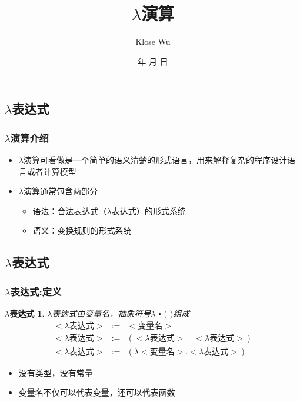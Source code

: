 \documentclass[CJK,compress,hyperref]{beamer}
\renewcommand{\today}{\number\year 年 \number\month 月 \number\day 日}
\begin{document}
\begin{CJK}{UTF8}{song}
 
\title{$\lambda$演算}
\author{Klose Wu}
\date{ \today}

\frame{\titlepage}
\tableofcontents
\section{$\lambda$表达式}

\begin{frame}
  \frametitle{$\lambda$演算介绍}
  \begin{itemize}
  \item $\lambda$演算可看做是一个简单的语义清楚的形式语言，用来解释复杂的程序设计语言或者计算模型
  \item $\lambda$演算通常包含两部分
    \begin{itemize} 
    \item{语法}：合法表达式（{\color{red}$\lambda$}表达式）的形式系统
    \item{语义}：变换规则的形式系统
    \end{itemize}
  \end{itemize}
\end{frame}

\subsection{ $\lambda$表达式}

\begin{frame}
  \frametitle{$\lambda$表达式:定义}
  \newtheorem{LE}{$\lambda$表达式} 
  \begin{LE}
    $\lambda$表达式由变量名，抽象符号$\lambda$  $\centerdot$  $($  $)$组成 
    \begin{eqnarray*}
      <\textrm{$\lambda$表达式}> & := & <\textrm{变量名}> \\
      <\textrm{$\lambda$表达式}> & := & (<\textrm{$\lambda$表达式}>\quad<\textrm{$\lambda$表达式}>) \\ 
      <\textrm{$\lambda$表达式}> & := & (\lambda<\textrm{变量名}>.<\textrm{$\lambda$表达式}>)  
    \end{eqnarray*} 
  \end{LE}      
  \begin{itemize}
  \item 没有类型，没有常量 
  \item 变量名不仅可以代表变量，还可以代表{\color{red}函数}
  \end{itemize}
\end{frame}


\end{CJK}
\end{document}
